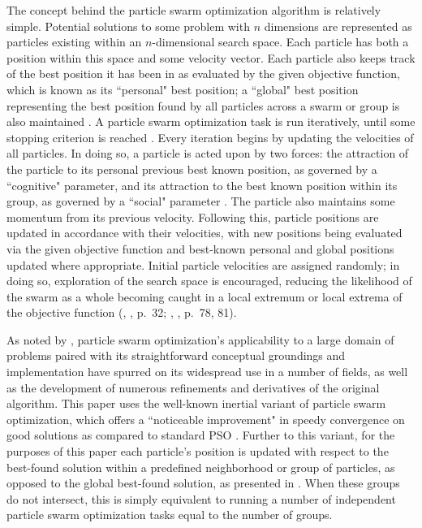 \documentclass[12pt,a4paper]{article}
\newcommand{\citetwo}[4]{(\citeauthor{#1}, \citeyear{#1}, p.~#2; \citeauthor{#3}, \citeyear{#3}, p.~#4)}
\begin{document}
The concept behind the particle swarm optimization algorithm is relatively simple. Potential solutions to some problem with $n$ dimensions are represented as particles existing within an $n$-dimensional search space. Each particle has both a position within this space and some velocity vector. Each particle also keeps track of the best position it has been in as evaluated by the given objective function, which is known as its ``personal" best position; a ``global" best position representing the best position found by all particles across a swarm or group is also maintained \citep{chong2013}. A particle swarm optimization task is run iteratively, until some stopping criterion is reached \citep[p.~80]{solnon2010}. Every iteration begins by updating the velocities of all particles. In doing so, a particle is acted upon by two forces: the attraction of the particle to its personal previous best known position, as governed by a ``cognitive" parameter, and its attraction to the best known position within its group, as governed by a ``social" parameter \citep{chong2013}. The particle also maintains some momentum from its previous velocity. Following this, particle positions are updated in accordance with their velocities, with new positions being evaluated via the given objective function and best-known personal and global positions updated where appropriate. Initial particle velocities are assigned randomly; in doing so, exploration of the search space is encouraged, reducing the likelihood of the swarm as a whole becoming caught in a local extremum or local extrema of the objective function \citetwo{yang2014}{32}{solnon2010}{78, 81}. 

As noted by \citet*[p.~99]{yang2014}, particle swarm optimization's applicability to a large domain of problems paired with its straightforward conceptual groundings and implementation have spurred on its widespread use in a number of fields, as well as the development of numerous refinements and derivatives of the original algorithm. This paper uses the well-known inertial variant of particle swarm optimization, which offers a ``noticeable improvement" in speedy convergence on good solutions as compared to standard PSO \citep[p.~101]{yang2014}. Further to this variant, for the purposes of this paper each particle's position is updated with respect to the best-found solution within a predefined neighborhood or group of particles, as opposed to the global best-found solution, as presented in \citet*[p.~79]{solnon2010}. When these groups do not intersect, this is simply equivalent to running a number of independent particle swarm optimization tasks equal to the number of groups.
\end{document}
